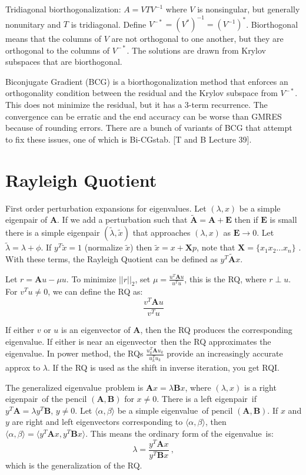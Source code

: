 \documentclass[12pt,twoside]{book}
\newcommand{\ve}[1]{\ensuremath{\mathbf{#1}}}
\newcommand{\evec}{eigenvector}
\newcommand{\eval}{eigenvalue}
\newcommand{\epair}{eigenpair}
\begin{document}
Tridiagonal biorthogonalization: $A = VTV^{-1}$ where $V$ is nonsingular, but generally nonunitary and $T$ is tridiagonal. Define $V^{-*} = (V^{*})^{-1} = (V^{-1})^{*}$. Biorthogonal means that the columns of $V$ are not orthogonal to one another, but they are orthogonal to the columns of $V^{-*}$. The solutions are drawn from Krylov subspaces that are biorthogonal.

Biconjugate Gradient (BCG) is a biorthogonalization method that enforces an orthogonality condition between the residual and the Krylov subspace from $V^{-*}$. This does not minimize the residual, but it has a 3-term recurrence. The convergence can be erratic and the end accuracy can be worse than GMRES because of rounding errors. There are a bunch of variants of BCG that attempt to fix these issues, one of which is Bi-CGstab. [T and B Lecture 39]. 


 
\section{Rayleigh Quotient}
First order perturbation expansions for eigenvalues. Let $(\lambda, x)$ be a simple eigenpair of $\ve{A}$. If we add a perturbation such that $\tilde{\ve{A}} = \ve{A} + \ve{E}$ then if $\ve{E}$ is small there is a simple eigenpair $(\tilde{\lambda}, \tilde{x})$ that approaches $(\lambda, x)$ as $\ve{E} \to 0$. Let $\tilde{\lambda} = \lambda + \phi$. If $y^{T}\tilde{x} = 1$ (normalize $\tilde{x}$) then $\tilde{x} = x + \ve{X}p$, note that $\ve{X} = \{x_{1} x_{2} ... x_{n}\}$ . With these terms, the Rayleigh Quotient can be defined as $y^{T}\tilde{\ve{A}}x$. 

Let $r = \ve{A}u - \mu u$. To minimize $||r||_{2}$, set $\mu = \frac{u^{T}\ve{A}u}{u^{T}u}$, this is the RQ, where $r \perp u$. For $v^{T}u \ne 0$, we can define the RQ as:
\begin{equation}
  \frac{v^{T}\ve{A}u}{v^{T}u}
\end{equation}

If either $v$ or $u$ is an eigenvector of $\ve{A}$, then the RQ produces the corresponding eigenvalue. If either is near an \evec\ then the RQ approximates the \eval. In power method, the RQs $\frac{u_{k}^{T}\ve{A}u_{k}}{u_{k}^{T}u_{k}}$ provide an increasingly accurate approx to $\lambda$. If the RQ is used as the shift in inverse iteration, you get RQI. 

The generalized \eval\ problem is $\ve{A}x = \lambda \ve{B}x$, where $(\lambda, x)$ is a right \epair\ of the pencil $(\ve{A}, \ve{B})$ for $x \ne 0$. There is a left \epair\ if $y^{T}\ve{A} = \lambda y^{T}\ve{B}$, $y \ne 0$. Let $\langle \alpha, \beta \rangle$ be a simple \eval\ of pencil $(\ve{A}, \ve{B})$. If $x$ and $y$ are right and left \evec s corresponding to $\langle \alpha, \beta \rangle$, then $\langle \alpha, \beta \rangle = \langle y^{T} \ve{A} x, y^{T} \ve{B} x \rangle$. This means the ordinary form of the \eval\ is:
\begin{equation}
 \lambda = \frac{y^{T} \ve{A} x}{y^{T} \ve{B} x} \:,
\end{equation}
which is the generalization of the RQ. 
\end{document}
